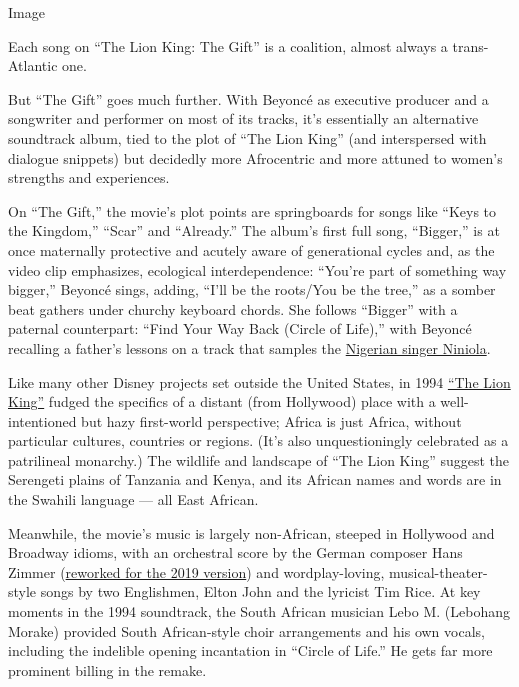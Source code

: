 Image

Each song on ``The Lion King: The Gift'' is a coalition, almost always a
trans-Atlantic one.

But ``The Gift'' goes much further. With Beyoncé as executive producer
and a songwriter and performer on most of its tracks, it's essentially
an alternative soundtrack album, tied to the plot of ``The Lion King''
(and interspersed with dialogue snippets) but decidedly more Afrocentric
and more attuned to women's strengths and experiences.

On ``The Gift,'' the movie's plot points are springboards for songs like
``Keys to the Kingdom,'' ``Scar'' and ``Already.'' The album's first
full song, ``Bigger,'' is at once maternally protective and acutely
aware of generational cycles and, as the video clip emphasizes,
ecological interdependence: ``You're part of something way bigger,''
Beyoncé sings, adding, ``I'll be the roots/You be the tree,'' as a
somber beat gathers under churchy keyboard chords. She follows
``Bigger'' with a paternal counterpart: ``Find Your Way Back (Circle of
Life),'' with Beyoncé recalling a father's lessons on a track that
samples the \href{https://www.youtube.com/watch?v=nCbjK4259RM}{Nigerian
singer Niniola}.

Like many other Disney projects set outside the United States, in 1994
\href{https://www.nytimes.com/2019/07/11/movies/the-lion-king-review.html}{``The
Lion King''} fudged the specifics of a distant (from Hollywood) place
with a well-intentioned but hazy first-world perspective; Africa is just
Africa, without particular cultures, countries or regions. (It's also
unquestioningly celebrated as a patrilineal monarchy.) The wildlife and
landscape of ``The Lion King'' suggest the Serengeti plains of Tanzania
and Kenya, and its African names and words are in the Swahili language
--- all East African.

Meanwhile, the movie's music is largely non-African, steeped in
Hollywood and Broadway idioms, with an orchestral score by the German
composer Hans Zimmer
(\href{https://variety.com/2019/artisans/production/hans-zimmer-recreates-score-lion-king-1203271637/}{reworked
for the 2019 version}) and wordplay-loving, musical-theater-style songs
by two Englishmen, Elton John and the lyricist Tim Rice. At key moments
in the 1994 soundtrack, the South African musician Lebo M. (Lebohang
Morake) provided South African-style choir arrangements and his own
vocals, including the indelible opening incantation in ``Circle of
Life.'' He gets far more prominent billing in the remake.

